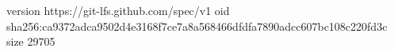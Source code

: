 version https://git-lfs.github.com/spec/v1
oid sha256:ca9372adca9502d4e3168f7ce7a8a568466dfdfa7890adcc607bc108c220fd3c
size 29705
